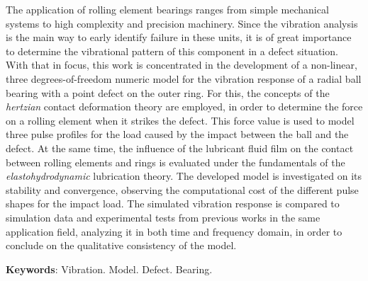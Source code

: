 The application of rolling element bearings ranges from simple mechanical systems to high complexity and precision machinery.
Since the vibration analysis is the main way to early identify failure in these units, it is of great importance to determine the vibrational pattern of this component in a defect situation.
With that in focus, this work is concentrated in the development of a non-linear, three degrees-of-freedom numeric model for the vibration response of a radial ball bearing with a point defect on the outer ring.
For this, the concepts of the \emph{hertzian} contact deformation theory are employed, in order to determine the force on a rolling element when it strikes the defect.
This force value is used to model three pulse profiles for the load caused by the impact between the ball and the defect.
At the same time, the influence of the lubricant fluid film on the contact between rolling elements and rings is evaluated under the fundamentals of the \emph{elastohydrodynamic} lubrication theory.
The developed model is investigated on its stability and convergence, observing the computational cost of the different pulse shapes for the impact load.
The simulated vibration response is compared to simulation data and experimental tests from previous works in the same application field, analyzing it in both time and frequency domain, in order to conclude on the qualitative consistency of the model.
\vspace{\onelineskip}

\textbf{Keywords}: Vibration. Model. Defect. Bearing.
